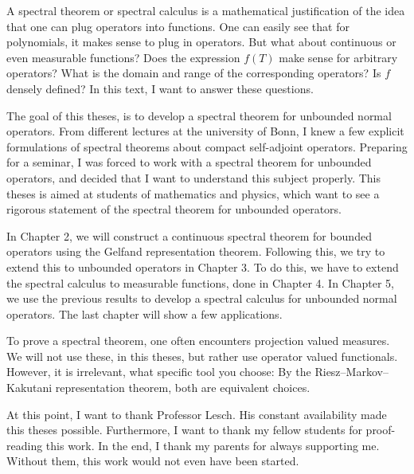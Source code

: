 \newpage

\vspace{.35cm}

\noindent

A spectral theorem or spectral calculus is a mathematical justification 
of the idea that one can plug operators into functions. One can easily see
that for polynomials, it makes sense to plug in operators. But what about
continuous or even measurable functions? Does the expression $f(T)$ make 
sense for arbitrary operators? What is the domain and range of the corresponding
operators? Is $f$ densely defined? In this text, I want to answer these questions.

The goal of this theses, is to develop a spectral theorem for unbounded normal
operators. From different lectures at the university of Bonn, I knew a few explicit
formulations of spectral theorems about compact self-adjoint operators. Preparing
for a seminar, I was forced to work with a spectral theorem for unbounded operators, 
and decided that I want to understand this subject properly. This theses is aimed
at students of mathematics and physics, which want to see a rigorous statement
of the spectral theorem for unbounded operators.

In Chapter 2, we will construct a continuous spectral theorem for bounded operators
using the Gelfand representation theorem. Following this, we try to extend this to unbounded
operators in Chapter 3. To do this, we have to extend the spectral calculus to measurable
functions, done in Chapter 4. In Chapter 5, we use the previous results to develop a spectral
calculus for unbounded normal operators. The last chapter will show a few applications.

To prove a spectral theorem, one often encounters projection valued measures. We will not 
use these, in this theses, but rather use operator valued functionals.
However, it is irrelevant, what specific tool you choose:
By the Riesz--Markov--Kakutani representation theorem, both are equivalent choices.

At this point, I want to thank Professor Lesch. His constant availability made this theses possible.
Furthermore, I want to thank my fellow students for proof-reading this work. In the end, I thank
my parents for always supporting me. Without them, this work would not even have been started.



